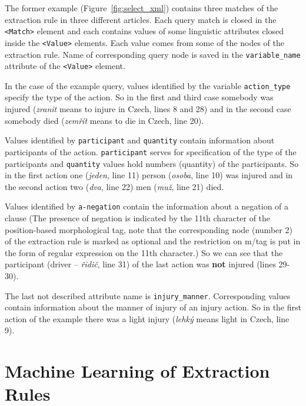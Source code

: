The former example (Figure~\ref{fig:select_xml}) contains three matches of the extraction rule in three different articles. Each query match is closed in the \verb+<Match>+ element and each contains values of some linguistic attributes closed inside the \verb+<Value>+ elements. Each value comes from some of the nodes of the extraction rule. Name of corresponding query node is saved in the \verb+variable_name+ attribute of the \verb+<Value>+ element.

In the case of the example query, values identified by the variable \verb+action_type+ specify the type of the action. So in the first and third case somebody was injured (\emph{zranit} means to injure in Czech, lines 8 and 28) and in the second case somebody died (\emph{zemřít} means to die in Czech, line 20).

Values identified by \verb+participant+ and \verb+quantity+ contain information about participants of the action. \verb+participant+ serves for specification of the type of the participants and \verb+quantity+ values hold numbers (quantity) of the participants. So in the first action one (\emph{jeden}, line 11) person (\emph{osoba}, line 10) was injured and in the second action two (\emph{dva}, line 22) men (\emph{muž}, line 21) died.

Values identified by \verb+a-negation+ contain the information about a negation of a clause (The presence of negation is indicated by the 11th character of the position-based morphological tag, note that the corresponding node (number 2) of the extraction rule is marked as optional and the restriction on m/tag is put in the form of regular expression on the 11th character.) So we can see that the participant (driver -- \emph{řidič}, line 31) of the last action was \textbf{not} injured (lines 29-30).

The last not described attribute name is \verb+injury_manner+. Corresponding values contain information about the manner of injury of an injury action. So in the first action of the example there was a light injury (\emph{lehký} means light in Czech, line 9).








\section{Machine Learning of Extraction Rules} \graphicspath{{../img/ch60/}} \label{sec:learning_impl}



